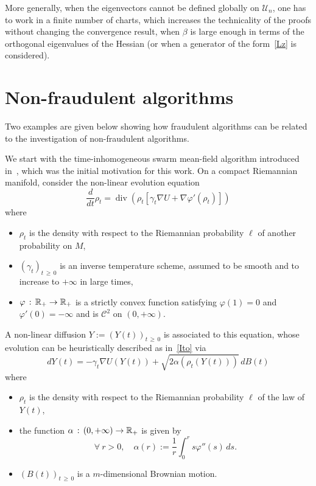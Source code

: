 \documentclass[AHL,Unicode,longabstracts,published]{cedram}
\newcommand{\f}[2]{\frac{#1}{#2}}
\newcommand{\cC}{\mathcal{C}}
\newcommand{\cU}{\mathcal{U}}
\newcommand{\RR}{\mathbb{R}}
\newcommand{\iy}{\infty}
\newcommand{\na}{\nabla}
\DeclareMathOperator{\dive}{div}
\newcommand{\fo}{\forall\ }
\renewcommand*{\to}{\mathchoice{\longrightarrow}{\rightarrow}{\rightarrow}{\rightarrow}}
\let\oldforall\forall
\renewcommand*{\forall}{\mathrel{\oldforall}}
\begin{document}
More generally, when the eigenvectors cannot be defined globally on $\cU_n$, one has to work in a finite number of charts, which increases the technicality of the proofs without changing the convergence result, when $\beta$ is large enough in terms of the orthogonal eigenvalues of the Hessian (or when a generator of the form~\eqref{Lz} is considered).



\appendix

\section{Non-fraudulent algorithms}

Two examples are given below showing how fraudulent algorithms can be related to the investigation of non-fraudulent algorithms.

 We start with the time-inhomogeneous swarm mean-field algorithm introduced in~\cite{https://doi.org/10.48550/arxiv.2204.01306}, which was the initial motivation for this work. On a compact Riemannian manifold, consider the non-linear evolution equation
\begin{equation}\label{rho}
\f{d}{dt} \rho_t = \dive(\rho_t[\gamma_t\na U+\na \varphi'(\rho_t)])
\end{equation}
where
\begin{itemize}
\item $\rho_t$ is the density with respect to the Riemannian probability $\ell$ of another probability on $M$,
\item $(\gamma_t)_{t\,\geq\,0}$ is an inverse temperature scheme, assumed to be smooth and to increase to $+\iy$ in large times,
\item $\varphi\,:\, \RR_+\to\RR_+$ is a strictly convex function satisfying $\varphi(1)=0$ and $\varphi'(0)=-\iy$ and is $\cC^2$ on $(0,+\iy)$.
\end{itemize}


A non-linear diffusion $Y:=(Y(t))_{t\,\geq\,0}$ is associated to this equation, whose evolution can be heuristically described as in~\eqref{Ito} via
\begin{equation*}
dY(t) = -\gamma_t\na U(Y(t))+\sqrt{2\alpha(\rho_t(Y(t)))} \, dB(t)
\end{equation*}
where
\begin{itemize}
\item $\rho_t$ is the density with respect to the Riemannian probability $\ell$ of the law of $Y(t)$,
\item the function $\alpha \,:\, (0,+\iy)\to \RR_+$ is given by
\begin{equation*}
\fo r> 0,\quad \alpha(r) := \f1r\int_0^r s\varphi''(s)\, ds.
\end{equation*}
\item $(B(t))_{t\,\geq\,0}$ is a $m$-dimensional Brownian motion.
\end{itemize}
\end{document}

